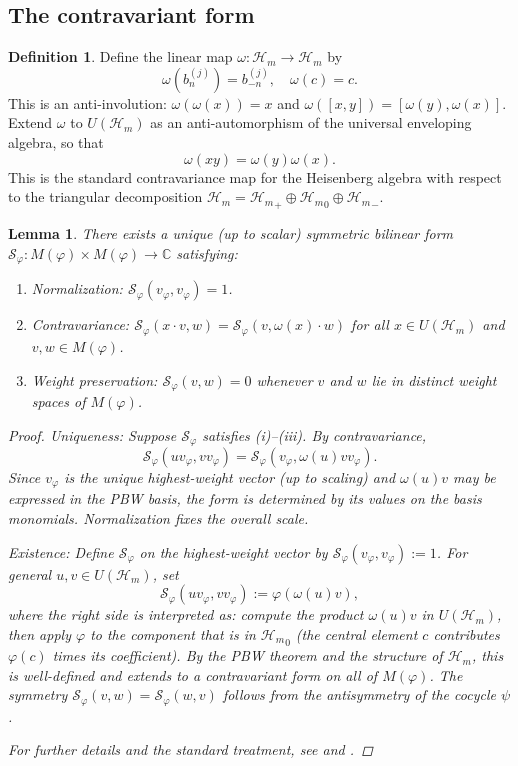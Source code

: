 \documentclass[12pt]{amsart}
\theoremstyle{plain}
\newtheorem{lemma}[theorem]{Lemma}
\theoremstyle{definition}
\newtheorem{definition}[theorem]{Definition}
\newcommand{\CC}{\mathbb{C}}
\newcommand{\Hm}{{\mathcal{H}_m}}     %
\newcommand{\Mf}{M(\varphi)}          %
\newcommand{\Sf}{\mathcal{S}_\varphi} %
\newcommand{\vf}{v_\varphi}           %
\begin{document}
\subsection{The contravariant form}
\label{subsec:contravariant-form}

\begin{definition}
\label{def:omega-involution}
Define the linear map $\omega : \Hm \to \Hm$ by
\[
  \omega(b_n^{(j)}) = b_{-n}^{(j)}, \quad \omega(c) = c.
\]
This is an anti-involution: $\omega(\omega(x)) = x$ and $\omega([x,y]) = [\omega(y), \omega(x)]$.
Extend $\omega$ to $U(\Hm)$ as an anti-automorphism of the universal
enveloping algebra, so that
\[
  \omega(xy) = \omega(y) \omega(x).
\]
This is the standard contravariance map for the Heisenberg algebra with
respect to the triangular decomposition $\Hm = \Hm_+ \oplus \Hm_0 \oplus \Hm_-$.
\end{definition}

\begin{lemma}
\label{lem:shapovalov-existence}
There exists a unique (up to scalar) symmetric bilinear form
$\Sf : \Mf \times \Mf \to \CC$ satisfying:
\begin{enumerate}[label=(\roman*)]
  \item Normalization: $\Sf(\vf, \vf) = 1$.
  \item Contravariance: $\Sf(x \cdot v, w) = \Sf(v, \omega(x) \cdot w)$
        for all $x \in U(\Hm)$ and $v, w \in \Mf$.
  \item Weight preservation: $\Sf(v, w) = 0$ whenever $v$ and $w$
        lie in distinct weight spaces of $\Mf$.
\end{enumerate}
\begin{proof}
\textit{Uniqueness:} Suppose $\Sf$ satisfies (i)--(iii). By contravariance,
\[
  \Sf(u \vf, v \vf) = \Sf(\vf, \omega(u) v \vf).
\]
Since $\vf$ is the unique highest-weight vector (up to scaling) and
$\omega(u) v$ may be expressed in the PBW basis, the form is determined
by its values on the basis monomials. Normalization fixes the overall scale.

\textit{Existence:} Define $\Sf$ on the highest-weight vector by
$\Sf(\vf, \vf) := 1$. For general $u, v \in U(\Hm)$, set
\[
  \Sf(u \vf, v \vf) := \varphi(\omega(u) v),
\]
where the right side is interpreted as: compute the product $\omega(u) v$
in $U(\Hm)$, then apply $\varphi$ to the component that is in $\Hm_0$
(the central element $c$ contributes $\varphi(c)$ times its coefficient).
By the PBW theorem and the structure of $\Hm$, this is well-defined and
extends to a contravariant form on all of $\Mf$. The symmetry $\Sf(v,w) = \Sf(w,v)$
follows from the antisymmetry of the cocycle $\psi$.

For further details and the standard treatment, see \cite{Shapovalov1972} and \cite[Ch.~2]{KacRaina}.
\end{proof}
\end{lemma}
\end{document}
